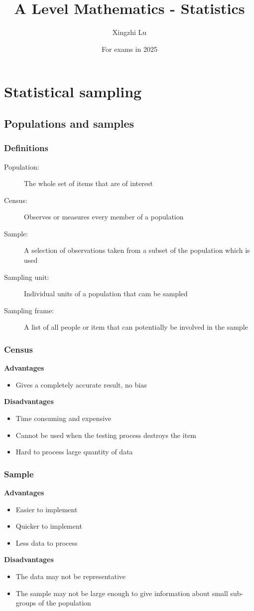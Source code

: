 \documentclass[A4paper, 11pt]{article}
\title{A Level Mathematics - Statistics}
\author{Xingzhi Lu}
\date{For exams in 2025}
\begin{document}
	\maketitle
	\section{Statistical sampling}
	
	\subsection{Populations and samples}
	\subsubsection{Definitions}
	\begin{description}
		\item[Population:] The whole set of items that are of interest
		\item[Census:] Observes or measures every member of a population
		\item[Sample:] A selection of observations taken from a subset of the population which is used
		\item[Sampling unit:] Individual units of a population that cam be sampled
		\item[Sampling frame:] A list of all people or item that can potentially be involved in the sample
	\end{description}
	
	\subsubsection{Census}
	\textbf{Advantages}
	\begin{itemize}
		\item Gives a completely accurate result, no bias
	\end{itemize}
	\textbf{Disadvantages}
	\begin{itemize}
		\item Time consuming and expensive
		\item Cannot be used when the testing process destroys the item
		\item Hard to process large quantity of data
	\end{itemize}
	\subsubsection{Sample}
	\textbf{Advantages}
	\begin{itemize}
		\item Easier to implement
		\item Quicker to implement
		\item Less data to process
	\end{itemize}
	\textbf{Disadvantages}
	\begin{itemize}
		\item The data may not be representative
		\item The sample may not be large enough to give information about small sub-groups of the population
	\end{itemize}
\end{document}
